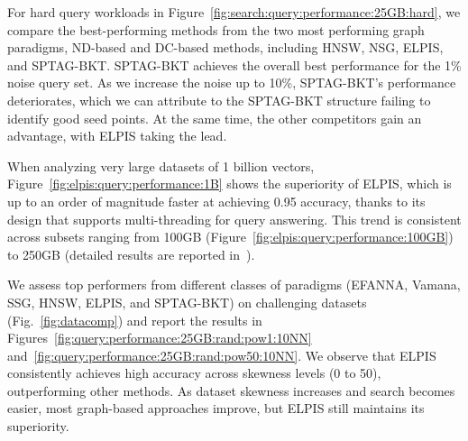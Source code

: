 For hard query workloads in Figure~\ref{fig:search:query:performance:25GB:hard}, we compare the best-performing methods from the two most performing graph paradigms, ND-based and DC-based methods, including HNSW, NSG, ELPIS, and SPTAG-BKT. SPTAG-BKT achieves the overall best performance for the 1\% noise query set. As we increase the noise up to 10\%, SPTAG-BKT's performance deteriorates, which we can attribute to the SPTAG-BKT structure failing to identify good seed points. At the same time, the other competitors gain an advantage, with ELPIS taking the lead. 

When analyzing very large datasets of 1 billion vectors, Figure~\ref{fig:elpis:query:performance:1B} shows the superiority of ELPIS, which is up to an order of magnitude faster at achieving 0.95 accuracy, thanks to its design that supports multi-threading for query answering. This trend is consistent across subsets ranging from 100GB (Figure~\ref{fig:elpis:query:performance:100GB}) to 250GB (detailed results are reported in~\cite{url/GASS}).

 We assess top performers from different classes of paradigms (EFANNA, Vamana, SSG, HNSW, ELPIS, and SPTAG-BKT) on challenging datasets (Fig.~\ref{fig:datacomp}) and report the results in Figures~\ref{fig:query:performance:25GB:rand:pow1:10NN} and~\ref{fig:query:performance:25GB:rand:pow50:10NN}. We observe that ELPIS consistently achieves high accuracy across skewness levels (0 to 50), outperforming other methods. As dataset skewness increases and search becomes easier, most graph-based approaches improve, but ELPIS still maintains its superiority.


